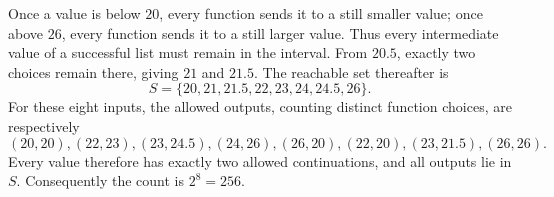 Once a value is below $20$, every function sends it to a still smaller value; once above $26$, every function sends it to a still larger value. Thus every intermediate value of a successful list must remain in the interval.
From $20.5$, exactly two choices remain there, giving $21$ and $21.5$. The reachable set thereafter is
\[
S=\{20,21,21.5,22,23,24,24.5,26\}.
\]
For these eight inputs, the allowed outputs, counting distinct function choices, are respectively
\[
(20,20),(22,23),(23,24.5),(24,26),(26,20),(22,20),(23,21.5),(26,26).
\]
Every value therefore has exactly two allowed continuations, and all outputs lie in $S$. Consequently the count is $\boxed{2^8=256}$.
